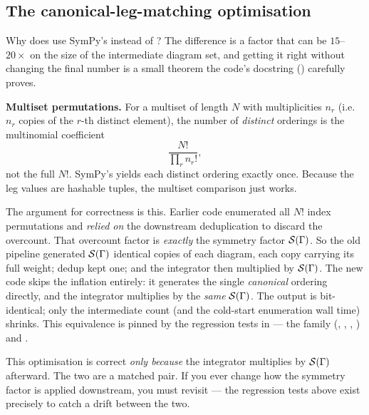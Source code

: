 \subsection{The canonical-leg-matching optimisation}\label{sec:ta-canonical}

Why does  use SymPy's 
instead of ? The difference is a factor that can be
$15$--$20\times$ on the size of the intermediate diagram set, and getting it
right without changing the final number is a small theorem the code's docstring
() carefully proves.

\begin{defn}
\textbf{Multiset permutations.}
For a multiset of length $N$ with multiplicities $n_r$ (i.e. $n_r$ copies of the
$r$-th distinct element), the number of \emph{distinct} orderings is the
multinomial coefficient
\[
  \frac{N!}{\prod_r n_r!},
\]
not the full $N!$. SymPy's  yields each distinct
ordering exactly once. Because the leg values are hashable  tuples, the multiset comparison just works.
\end{defn}

The argument for correctness is this. Earlier code enumerated all $N!$ index
permutations and \emph{relied on} the downstream deduplication to discard the
overcount. That overcount factor is \emph{exactly} the symmetry factor
$\mathcal{S}(\Gamma)$. So the old pipeline generated $\mathcal{S}(\Gamma)$ identical copies of
each diagram, each copy carrying its full weight; dedup kept one; and the
integrator then multiplied by $\mathcal{S}(\Gamma)$. The new code skips the inflation
entirely: it generates the single \emph{canonical} ordering directly, and the
integrator multiplies by the \emph{same} $\mathcal{S}(\Gamma)$. The output is
bit-identical; only the intermediate count (and the cold-start enumeration wall
time) shrinks. This equivalence is pinned by the regression tests in
 --- the 
family (, ,
, ) and
.

\begin{gotcha}
This optimisation is correct \emph{only because} the integrator multiplies by
$\mathcal{S}(\Gamma)$ afterward. The two are a matched pair. If you ever change how the
symmetry factor is applied downstream, you must revisit  ---
the regression tests above exist precisely to catch a drift between the two.
\end{gotcha}

